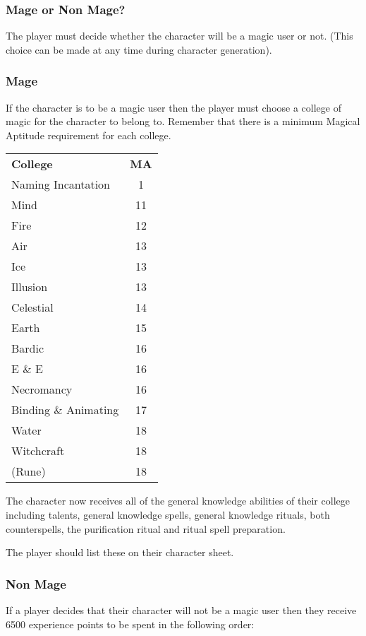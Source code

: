 \begin{multicols*}{3}
\subsubsection{Mage or Non Mage?}

The player must decide whether the character will be a magic user or
not. (This choice can be made at any time during character
generation).

\subsubsection{Mage}

If the character is to be a magic user then the player must choose a
college of magic for the character to belong to. Remember that there
is a minimum Magical Aptitude requirement for each college.

\begin{tabular}{lc}
\textbf{College}	& \textbf{MA} \\
Naming Incantation	& 1 \\
Mind			& 11 \\
Fire			& 12 \\
Air			& 13 \\
Ice			& 13 \\
Illusion		& 13 \\
Celestial		& 14 \\
Earth			& 15 \\
Bardic			& 16 \\
E \& E			& 16 \\
Necromancy		& 16 \\
Binding \& Animating	& 17 \\
Water			& 18 \\
Witchcraft		& 18 \\
(Rune)			& 18 \\
\end{tabular}

The character now receives all of the general knowledge abilities of
their college including talents, general knowledge spells, general
knowledge rituals, both counterspells, the purification ritual and
ritual spell preparation.

The player should list these on their character sheet.

\subsubsection{Non Mage}

If a player decides that their character will not be a magic user then
they receive 6500 experience points to be spent in the following
order:


\end{multicols*}
